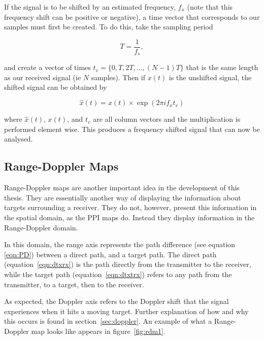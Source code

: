 \documentclass[12pt,openany,a4paper]{book}
\begin{document}
If the signal is to be shifted by an estimated frequency, $f_x$ (note that this frequency shift can be positive or negative), a time vector that corresponds to our samples must first be created. To do this, take the sampling period

\begin{equation}
T = \frac{1}{f_s},
\end{equation}

\bigskip

and create a vector of times $t_v = \{0, T, 2T, \ldots , (N-1)T\}$ that is the same length as our received signal (ie $N$ samples). Then if $x(t)$ is the unshifted signal, the shifted signal can be obtained by 

\begin{equation}
\hat{x}(t) = x(t) \times \exp (2\pi i f_x t_v )
\end{equation}

\bigskip

where $\hat{x}(t)$, $x(t)$, and $t_v$ are all column vectors and the multiplication is performed element wise. This produces a frequency shifted signal that can now be analysed.


\subsection{Range-Doppler Maps}
\label{sec:rdMap}
Range-Doppler maps are another important idea in the development of this thesis. They are essentially another way of displaying the information about targets surrounding a receiver. They do not, however, present this information in the spatial domain, as the PPI maps do. Instead they display information in the Range-Doppler domain. 

\bigskip

In this domain, the range axis represents the path difference (see equation \ref{eqn:PD}) between a direct path, and a target path. The direct path (equation~\ref{eqn:dtxrx}) is the path directly from the transmitter to the receiver, while the target path (equation~\ref{eqn:dtxtrx}) refers to any path from the transmitter, to a target, then to the receiver.

\bigskip

As expected, the Doppler axis refers to the Doppler shift that the signal experiences when it hits a moving target. Further explanation of how and why this occurs is found in section~\ref{sec:doppler}. An example of what a Range-Doppler map looks like appears in figure~\ref{fig:rdm1}.
\end{document}
